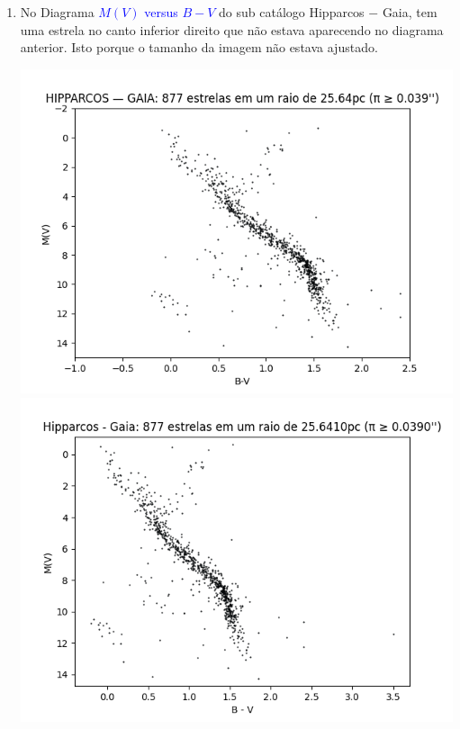 \documentclass{article}
\begin{document}
\begin{enumerate}
		\newpage
		
		\item No Diagrama \textcolor{blue}{$M(V)$ versus $B-V$} do sub catálogo Hipparcos $-$ Gaia, tem uma estrela no canto inferior direito que não estava aparecendo no diagrama anterior. Isto porque o tamanho da imagem não estava ajustado.

		\begin{multicols}{2}
			\centering
			\includegraphics[width=.98\linewidth]{hipparcos_minus_gaia_mv_versus_b_minus_v_plx_greater_than_or_iqual_to_0.039.png}
			\columnbreak
			\includegraphics[width=.98\linewidth]{Hipparcos_minus_Gaia_MV_versus_B_minus_V.png}
		\end{multicols}
	

\end{enumerate}
\end{document}

